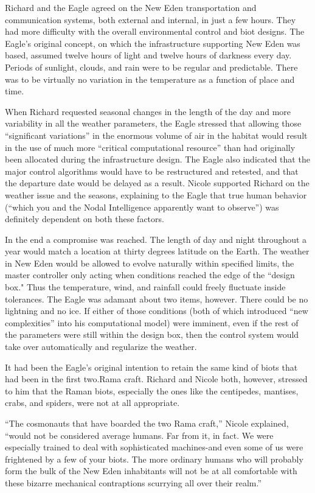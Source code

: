 \documentclass[]{article}
\begin{document}
{Richard and the Eagle agreed on the New Eden transportation and communication systems, both external and internal, in just a few hours.  They had more difficulty with the overall environmental control and biot designs.  The Eagle’s original concept, on which the infrastructure supporting New Eden was based, assumed twelve hours of light and twelve hours of darkness every day.  Periods of sunlight, clouds, and rain were to be regular and predictable.  There was to be virtually no variation in the temperature as a function of place and time.

When Richard requested seasonal changes in the length of the day and more variability in all the weather parameters, the Eagle stressed that allowing those “significant variations” in the enormous volume of air in the habitat would result in the use of much more “critical computational resource” than had originally been allocated during the infrastructure design.  The Eagle also indicated that the major control algorithms would have to be restructured and retested, and that the departure date would be delayed as a result.  Nicole supported Richard on the weather issue and the seasons, explaining to the Eagle that true human behavior (“which you and the Nodal Intelligence apparently want to observe”) was definitely dependent on both these factors.

In the end a compromise was reached.  The length of day and night throughout a year would match a location at thirty degrees latitude on the Earth.  The weather in New Eden would be allowed to evolve naturally within specified limits, the master controller only acting when conditions reached the edge of the “design box."  Thus the temperature, wind, and rainfall could freely fluctuate inside tolerances.  The Eagle was adamant about two items, however.  There could be no lightning and no ice.  If either of those conditions (both of which introduced “new complexities” into his computational model) were imminent, even if the rest of the parameters were still within the design box, then the control system would take over automatically and regularize the weather.

It had been the Eagle’s original intention to retain the same kind of biots that had been in the first two.Rama craft.  Richard and Nicole both, however, stressed to him that the Raman biots, especially the ones like the centipedes, mantises, crabs, and spiders, were not at all appropriate.

“The cosmonauts that have boarded the two Rama craft,” Nicole explained, “would not be considered average humans.  Far from it, in fact.  We were especially trained to deal with sophisticated machines-and even some of us were frightened by a few of your biots.  The more ordinary humans who will probably form the bulk of the New Eden inhabitants will not be at all comfortable with these bizarre mechanical contraptions scurrying all over their realm.”

}
\end{document}
